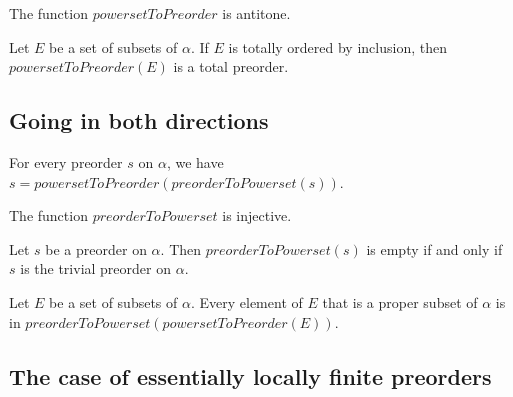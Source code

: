 \begin{sublemma}
The function $powersetToPreorder$ is antitone.

\end{sublemma}

\begin{sublemma}
Let $E$ be a set of subsets of $\alpha$. If $E$ is totally ordered by inclusion, then $powersetToPreorder(E)$ is a
total preorder.

\end{sublemma}

\subsection{Going in both directions}

\begin{sublemma}[preorderToPowersetToPreorder]
For every preorder $s$ on $\alpha$, we have $s=powersetToPreorder(preorderToPowerset(s))$.

\end{sublemma}

\begin{sublemma}
The function $preorderToPowerset$ is injective.

\end{sublemma}

\begin{sublemma}
Let $s$ be a preorder on $\alpha$. Then $preorderToPowerset(s)$ is empty if and only if $s$ is the trivial preorder on $\alpha$.

\end{sublemma}

\begin{sublemma}[powersetToPreorderToPowerset]
Let $E$ be a set of subsets of $\alpha$. Every element of $E$ that is a proper subset of $\alpha$ is in
$preorderToPowerset(powersetToPreorder(E))$.

\end{sublemma}


\subsection{The case of essentially locally finite preorders}

